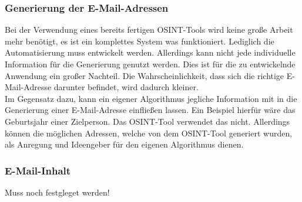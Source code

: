 	\subsubsection{Generierung der E-Mail-Adressen}
	Bei der Verwendung eines bereits fertigen OSINT-Tools wird keine große Arbeit mehr benötigt, es ist ein komplettes System was funktioniert. Lediglich die Automatisierung muss entwickelt werden. Allerdings kann nicht jede individuelle Information für die Generierung genutzt werden. Dies ist für die zu entwickelnde Anwendung ein großer Nachteil. Die Wahrscheinlichkeit, dass sich die richtige E-Mail-Adresse darunter befindet, wird dadurch kleiner.\\
	Im Gegensatz dazu, kann ein eigener Algorithmus jegliche Information mit in die Generierung einer E-Mail-Adresse einfließen lassen. Ein Beispiel hierfür wäre das Geburtsjahr einer Zielperson. Das OSINT-Tool \cite{EmailAssumptions} verwendet das nicht. Allerdings können die möglichen Adressen, welche von dem OSINT-Tool generiert wurden, als Anregung und Ideengeber für den eigenen Algorithmus dienen.
	\subsubsection{E-Mail-Inhalt}
	Muss noch festgleget werden!
